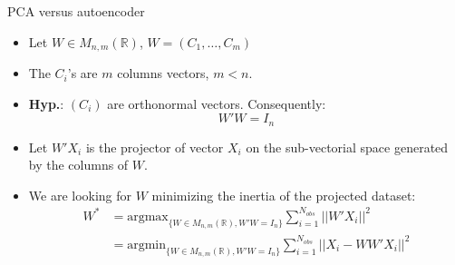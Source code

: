 \documentclass[
  ignorenonframetext,
]{beamer}
\begin{document}
\begin{frame}{PCA versus autoencoder}
\protect\hypertarget{pca-versus-autoencoder}{}
\begin{itemize}
\item
  Let \(W \in M_{n,m}(\mathbb{R})\), \(W = (C_1,\dots,C_m)\)
\item
  The \(C_i\)'s are \(m\) columns vectors, \(m < n\).
\item
  \textbf{Hyp.}: \((C_i)\) are orthonormal vectors. Consequently:
  \[W'W = I_n\]
\item
  Let \(W' X_i\) is the projector of vector \(X_i\) on the sub-vectorial
  space generated by the columns of \(W\).
\item
  We are looking for \(W\) minimizing the inertia of the projected
  dataset: \[
  \begin{aligned}
  W^* &=\mbox{argmax}_{\{W \in M_{n,m}(\mathbb{R}), W'W = I_n\}} \sum_{i=1}^{N_{obs}} || W'X_i||^2\\ &=\mbox{argmin}_{\{W \in M_{n,m}(\mathbb{R}), W'W = I_n\}} \sum_{i=1}^{N_{obs}} || X_i - WW'X_i||^2
  \end{aligned}
  \]
\end{itemize}
\end{frame}
\end{document}
